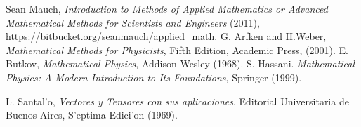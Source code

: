 \begin{thebibliography}{99}
 Sean Mauch, {\em Introduction to Methods of Applied Mathematics                           or Advanced Mathematical Methods for Scientists and Engineers} (2011), \url{https://bitbucket.org/seanmauch/applied_math}.
 G. Arfken and H.Weber, {\em Mathematical Methods for Physicists}, Fifth Edition, Academic Press, (2001).
 E. Butkov, {\em Mathematical Physics}, Addison-Wesley (1968).
 S. Hassani. {\em Mathematical Physics: A Modern Introduction to Its Foundations}, Springer (1999).
\item L. Santal'o, {\em Vectores y Tensores con sus aplicaciones}, Editorial Universitaria de Buenos Aires, S'eptima Edici'on (1969).
\end{thebibliography}
